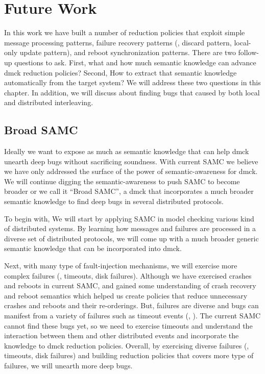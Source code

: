 \section{Future Work}
\label{sec-future}

In this work we have built a number of reduction policies that exploit simple
message processing patterns, failure recovery patterns (\eg, discard pattern,
local-only update pattern), and reboot synchronization patterns. There are two
follow-up questions to ask.  First, what and how much semantic knowledge can
advance dmck reduction policies?  Second, How to extract that semantic knowledge
automatically from the target system? We will address these two questions in
this chapter. In addition, we will discuss about finding bugs that caused by
both local and distributed interleaving.

\subsection{Broad SAMC}
Ideally we want to expose as much as semantic knowledge that can help dmck
unearth deep bugs without sacrificing soundness. With current SAMC we believe we
have only addressed the surface of the power of semantic-awareness for dmck.  We
will continue digging the semantic-awareness to push SAMC to become broader or
we call it ``Broad SAMC'', a dmck that incorporates a much broader semantic
knowledge to find deep bugs in several distributed protocols. 

To begin with, We will start by applying SAMC in model checking various kind of
distributed systems. By learning how messages and failures are processed in a
diverse set of distributed protocols, we will come up with a much broader generic
semantic knowledge that can be incorporated into dmck.

Next, with many type of fault-injection mechanisms, we will exercise more
complex failures (\eg, timeouts, disk failures). Although we have exercised
crashes and reboots in current SAMC, and gained some understanding of crash
recovery and reboot semantics which helped us create policies that reduce
unnecessary crashes and reboots and their re-orderings. But, failures are
diverse and bugs can manifest from a variety of failures such as timeout events
(, ). The current SAMC cannot find these bugs yet, so we need
to exercise timeouts and understand the interaction between them and other
distributed events and incorporate the knowledge to dmck reduction policies.
Overall, by exercising diverse failures (\eg, timeouts, disk failures) and
building reduction policies that covers more type of failures, we will unearth
more deep bugs.

